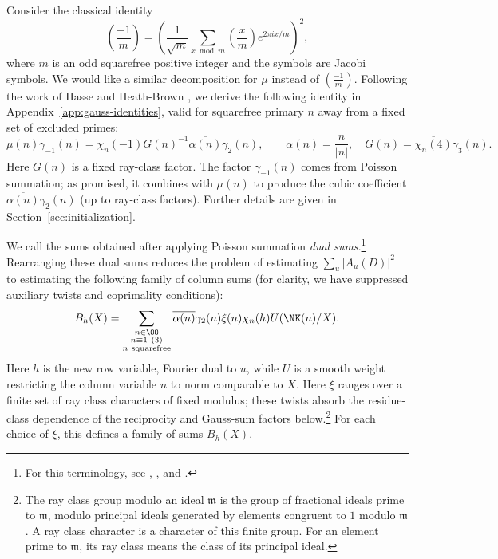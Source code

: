 Consider the classical identity
\[
 \left(\frac{-1}{m}\right)=\left(\frac{1}{\sqrt{m}}\sum_{x\bmod m}\left(\frac{x}{m}\right)e^{2\pi ix/m}\right)^2,
\]
where $m$ is an odd squarefree positive integer and the symbols are Jacobi symbols. We would like a similar decomposition for $\mu$ instead of $\left(\frac{-1}{m}\right)$. Following the work of Hasse \cite[pp.~443--445]{Has50} and Heath-Brown \cite[(2)]{HB00}, we derive the following identity in Appendix~\ref{app:gauss-identities}, valid for squarefree primary $n$ away from a fixed set of excluded primes:
\[
 \mu(n)\gamma_{-1}(n)=\chi_n(-1)G(n)^{-1}\overline{\alpha(n)}\gamma_2(n),
 \qquad \alpha(n)=\frac{n}{|n|},\quad G(n)=\overline{\chi_n(4)}\gamma_3(n).
\]
Here $G(n)$ is a fixed ray-class factor. The factor $\gamma_{-1}(n)$ comes from Poisson summation; as promised, it combines with $\mu(n)$ to produce the cubic coefficient $\overline{\alpha(n)}\gamma_2(n)$ (up to ray-class factors). Further details are given in Section~\ref{sec:initialization}.

We call the sums obtained after applying Poisson summation \emph{dual sums}.\footnote{For this terminology, see \cite[p.~440]{PY20},
\cite[\S2.3]{KLMS20}, and \cite[arXiv abstract]{FLN10}.} Rearranging these dual sums reduces the problem of estimating
$\sum_u |A_u(D)|^2$ to estimating the following family of column sums (for clarity, we have suppressed auxiliary twists and coprimality conditions):
\begin{equation}\label{eq:intro-gauss-family}
 B_h(X)=\sum_{\substack{n\in\OO\\n\equiv1\ (3)\\n\ {\rm squarefree}}}
       \overline{\alpha(n)}\gamma_2(n)\xi(n)\chi_n(h)
       U(\NK(n)/X).
\end{equation}
Here $h$ is the new row variable, Fourier dual to $u$, while $U$ is a smooth weight restricting the column variable $n$ to norm comparable to $X$. Here $\xi$ ranges over a finite set of ray class characters of fixed modulus; these twists
absorb the residue-class dependence of the reciprocity and Gauss-sum factors below.\footnote{The ray class group modulo an ideal $\mathfrak m$ is the group of fractional ideals prime to $\mathfrak m$, modulo principal ideals generated by elements congruent to $1$ modulo $\mathfrak m$. A ray class character is a character of this finite group. For an element prime to $\mathfrak m$, its ray class means the class of its principal ideal.}  For each choice of $\xi$, this defines a family of sums $B_h(X)$.

